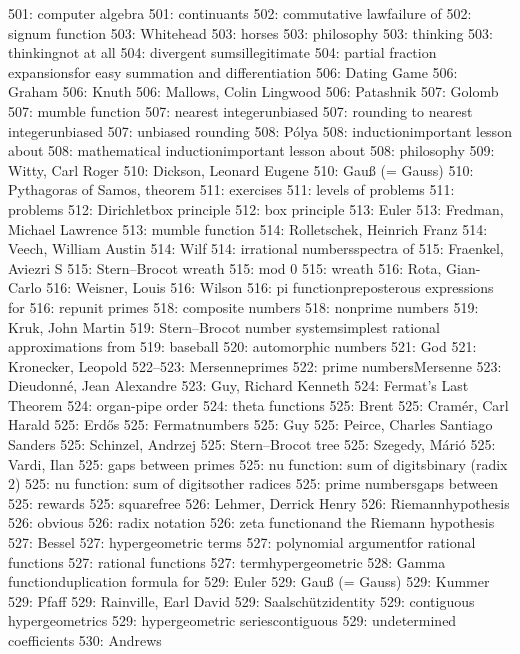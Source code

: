 501: computer algebra
501: continuants
502: commutative law\sub failure of
502: signum function
503: Whitehead
503: horses
503: philosophy
503: thinking
503: thinking\sub not at all
504: divergent sums\sub illegitimate
504: partial fraction expansions\sub for easy summation and differentiation
506: Dating Game
506: Graham
506: Knuth
506: Mallows, Colin Lingwood
506: Patashnik
507: Golomb
507: mumble function
507: nearest integer\sub unbiased
507: rounding to nearest integer\sub unbiased
507: unbiased rounding
508: P\'olya
508: induction\sub important lesson about
508: mathematical induction\sub important lesson about
508: philosophy
509: Witty, Carl Roger
510: Dickson, Leonard Eugene
510: Gau{\ss} (= Gauss)
510: Pythagoras of Samos, theorem
511: exercises
511: levels of problems
511: problems
512: Dirichlet\sub box principle
512: box principle
513: Euler
513: Fredman, Michael Lawrence
513: mumble function
514: Rolletschek, Heinrich Franz
514: Veech, William Austin
514: Wilf
514: irrational numbers\sub spectra of
515: Fraenkel, Aviezri S
515: Stern--Brocot wreath
515: mod $0$
515: wreath
516: Rota, Gian-Carlo
516: Weisner, Louis
516: Wilson
516: pi function\sub preposterous expressions for
516: repunit primes
518: composite numbers
518: nonprime numbers
519: Kruk, John Martin
519: Stern--Brocot number system\sub simplest rational approximations from
519: baseball
520: automorphic numbers
521: God
521: Kronecker, Leopold
522--523: Mersenne\sub primes
522: prime numbers\sub Mersenne
523: Dieudonn\'e, Jean Alexandre
523: Guy, Richard Kenneth
524: Fermat's Last Theorem
524: organ-pipe order
524: theta functions
525: Brent
525: Cram\'er, Carl Harald
525: Erd\H os
525: Fermat\sub numbers
525: Guy
525: Peirce, Charles Santiago Sanders
525: Schinzel, Andrzej
525: Stern--Brocot tree
525: Szegedy, M\'ari\'o
525: Vardi, Ilan
525: gaps between primes
525: nu function: sum of digits\sub binary (radix $2$)
525: nu function: sum of digits\sub other radices
525: prime numbers\sub gaps between
525: rewards
525: squarefree
526: Lehmer, Derrick Henry
526: Riemann\sub hypothesis
526: obvious
526: radix notation
526: zeta function\sub and the Riemann hypothesis
527: Bessel
527: hypergeometric terms
527: polynomial argument\sub for rational functions
527: rational functions
527: term\sub hypergeometric
528: Gamma function\sub duplication formula for
529: Euler
529: Gau{\ss} (= Gauss)
529: Kummer
529: Pfaff
529: Rainville, Earl David
529: Saalsch\"utz\sub identity
529: contiguous hypergeometrics
529: hypergeometric series\sub contiguous
529: undetermined coefficients
530: Andrews
